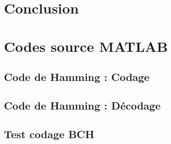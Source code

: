 \documentclass[a4paper, 12pt]{article}
\newcommand{\FSource}[1]{%

}
\begin{document}
\newpage

\section{Conclusion}

\clearpage

%
%
\appendix

\section{Codes source MATLAB}

\subsection{Code de Hamming : Codage}\label{hamcode}

\FSource{../hamcode.m}

\newpage

\subsection{Code de Hamming : Décodage}\label{hamdecode}

\FSource{../hamdecode.m}

\newpage

\subsection{Test codage BCH}\label{bchtest}

\FSource{../bchtest.m}
\end{document}
